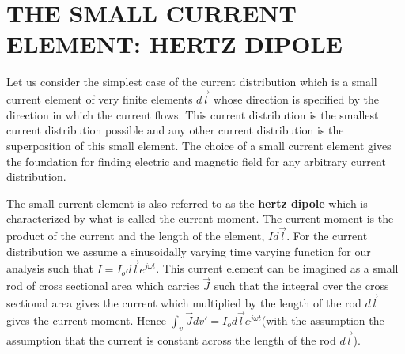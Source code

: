 \chapter{THE SMALL CURRENT ELEMENT: HERTZ DIPOLE}
Let us consider the simplest case of the current distribution which is a small current element of very finite elements $d\vec{l}$ whose direction is specified by the direction in which the current flows. This current distribution is the smallest current distribution possible and any other current distribution is the superposition of this small element. The choice of a small current element gives the foundation for finding electric and magnetic field for any arbitrary current distribution.

The small current element is also referred to as the \textbf{hertz dipole} which is characterized by what is called the current moment. The current moment is the product of the current and the length of the element, $Id\vec{l}$. For the current distribution we assume a sinusoidally varying time varying function for our analysis such that $I = I_od\vec{l}e^{j\omega t}$. This current element can be imagined as a small rod of cross sectional area which carries $\vec{J}$ such that the integral over the cross sectional area gives the current which multiplied by the length of the rod $d\vec{l}$ gives the current moment. Hence $\int_v\vec{J}dv' = I_od\vec{l}e^{j\omega t}$(with the assumption the assumption that the current is constant across the length of the rod $d\vec{l}$). 

